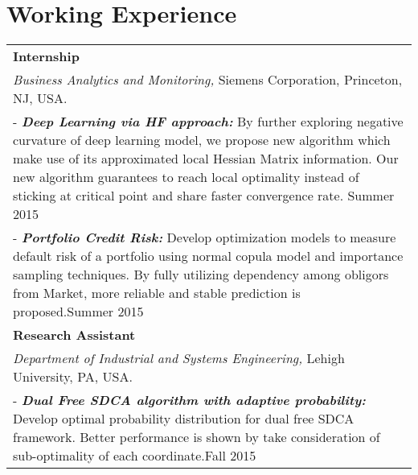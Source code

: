 \documentclass[a4paper,11pt]{article} %
\begin{document}
\section{Working Experience}
\begin{tabular}{p{17.5cm}}
\textbf{Internship} \\
\emph{Business Analytics and Monitoring,} Siemens Corporation, Princeton, NJ, USA.\\
\footnotesize{- \textbf{\emph{Deep Learning via HF approach: }}}
By further exploring negative curvature of deep learning model, we propose new algorithm which make use of its approximated local Hessian Matrix information. Our new algorithm guarantees to reach local optimality instead of sticking at critical point and share faster convergence rate. \hfill{Summer 2015}\\
\footnotesize{- \textbf{\emph{Portfolio Credit Risk: }} }
Develop optimization models to measure default risk of a portfolio using normal copula model and importance sampling techniques. By fully utilizing dependency among obligors from Market, more reliable and stable prediction is proposed.\hfill{Summer 2015}\\
\textbf{Research Assistant} \\
\emph{Department of Industrial and Systems Engineering,} Lehigh University, PA, USA. \\
\footnotesize{- \textbf{\emph{Dual Free SDCA algorithm with adaptive probability:}} Develop optimal probability distribution for dual free SDCA framework. Better performance is shown by take consideration of sub-optimality of each coordinate.\hfill{Fall 2015}}\\

\end{tabular}
\end{document}
